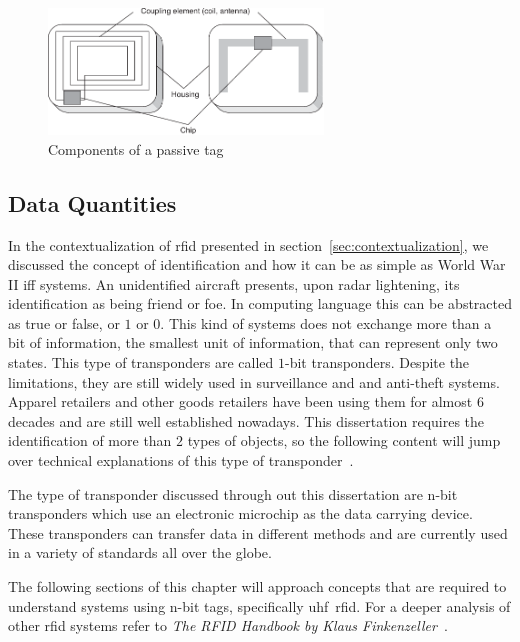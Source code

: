 \begin{figure}[!ht]
    \centering
    \includegraphics[width=0.65\textwidth]{./figs/02-state-of-the-art/tag.pdf}
    \caption[Components of a passive tag]{Components of a passive tag~\cite{finkenzellerRFIDHandbookFundamentals2003}} 
    \label{fig:passivetag}
\end{figure}

\subsection{Data Quantities}

In the contextualization of \ac{rfid} presented in section~\ref{sec:contextualization}, we discussed the concept of identification and how it can be as simple as World War II \ac{iff} systems. 
An unidentified aircraft presents, upon radar lightening, its identification as being friend or foe. In computing language this can be abstracted as true or false, or $1$ or $0$. This kind of systems does not exchange more than a bit of information, the smallest unit of information, that can represent only two states.
This type of transponders are called $1$-bit transponders. Despite the limitations, they are still widely used in surveillance and and anti-theft systems. Apparel retailers and other goods retailers have been using them for almost $6$ decades and are still well established nowadays. 
This dissertation requires the identification of more than $2$ types of objects, so the following content will jump over technical explanations of this type of transponder~\cite{finkenzellerRFIDHandbookFundamentals2003}. 

The type of transponder discussed through out this dissertation are n-bit transponders which use an electronic microchip as the data carrying device.
These transponders can transfer data in different methods and are currently used in a variety of standards all over the globe.

The following sections of this chapter will approach concepts that are required to understand systems using n-bit tags, specifically \acs{uhf}~\acs{rfid}.
For a deeper analysis of other \ac{rfid} systems refer to \emph{The RFID Handbook by Klaus Finkenzeller}~\cite{finkenzellerRFIDHandbookFundamentals2003}.

